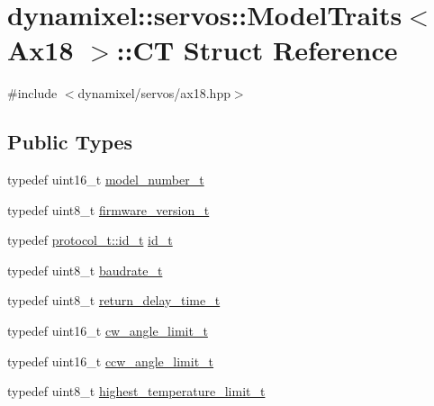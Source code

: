 \hypertarget{structdynamixel_1_1servos_1_1_model_traits_3_01_ax18_01_4_1_1_c_t}{}\section{dynamixel\+:\+:servos\+:\+:Model\+Traits$<$ Ax18 $>$\+:\+:CT Struct Reference}
\label{structdynamixel_1_1servos_1_1_model_traits_3_01_ax18_01_4_1_1_c_t}


{\ttfamily \#include $<$dynamixel/servos/ax18.\+hpp$>$}

\subsection*{Public Types}
\begin{DoxyCompactItemize}
\item 
typedef uint16\+\_\+t \hyperlink{structdynamixel_1_1servos_1_1_model_traits_3_01_ax18_01_4_1_1_c_t_a437fac337bfd18fc3e691f6f88f2bb7b}{model\+\_\+number\+\_\+t}
\item 
typedef uint8\+\_\+t \hyperlink{structdynamixel_1_1servos_1_1_model_traits_3_01_ax18_01_4_1_1_c_t_ac85f8672e5157970eb1564a9a7dee292}{firmware\+\_\+version\+\_\+t}
\item 
typedef \hyperlink{classdynamixel_1_1protocols_1_1_protocol1_a1d4dfa22b01f80b1876d14f539d52b5c}{protocol\+\_\+t\+::id\+\_\+t} \hyperlink{structdynamixel_1_1servos_1_1_model_traits_3_01_ax18_01_4_1_1_c_t_a3645632c4443b70ad251cde6a5e819d1}{id\+\_\+t}
\item 
typedef uint8\+\_\+t \hyperlink{structdynamixel_1_1servos_1_1_model_traits_3_01_ax18_01_4_1_1_c_t_a37d4200ff8dca006c8da3da602fcc312}{baudrate\+\_\+t}
\item 
typedef uint8\+\_\+t \hyperlink{structdynamixel_1_1servos_1_1_model_traits_3_01_ax18_01_4_1_1_c_t_a2ad0ce40d272ae8911e921a55927340e}{return\+\_\+delay\+\_\+time\+\_\+t}
\item 
typedef uint16\+\_\+t \hyperlink{structdynamixel_1_1servos_1_1_model_traits_3_01_ax18_01_4_1_1_c_t_aa00805d106a90248ed0a451835e6a205}{cw\+\_\+angle\+\_\+limit\+\_\+t}
\item 
typedef uint16\+\_\+t \hyperlink{structdynamixel_1_1servos_1_1_model_traits_3_01_ax18_01_4_1_1_c_t_a1340415777225a37fee7bd2add8ba47b}{ccw\+\_\+angle\+\_\+limit\+\_\+t}
\item 
typedef uint8\+\_\+t \hyperlink{structdynamixel_1_1servos_1_1_model_traits_3_01_ax18_01_4_1_1_c_t_ad5d339ef220bc7d5430e9d3e5879530c}{highest\+\_\+temperature\+\_\+limit\+\_\+t}

\end{DoxyCompactItemize}
